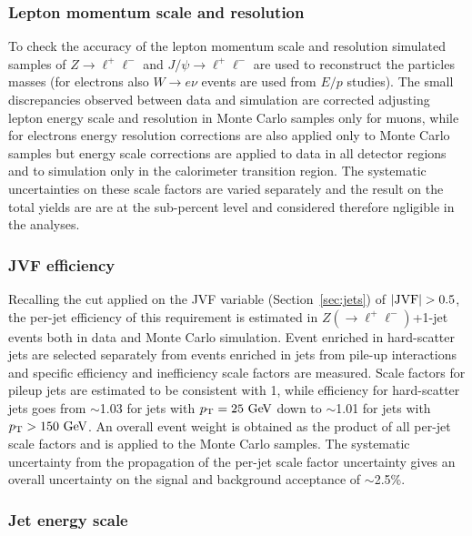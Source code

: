 \subsubsection{Lepton momentum scale and resolution}

To check the accuracy of the lepton momentum scale and resolution
simulated samples of $Z\to \ell^+\ell^-$ and $J/\psi \to \ell^+\ell^-$
are used to reconstruct the particles masses (for electrons also
 $W\to e\nu$ events are used from  $E/p$  studies).
The small discrepancies observed between data and simulation are
corrected adjusting lepton energy scale and resolution in Monte Carlo
samples only for muons, while for electrons energy resolution corrections
are also applied only to Monte Carlo samples but energy scale corrections
are applied to data in all detector regions and to simulation only in 
the calorimeter transition region.
The systematic uncertainties on these scale factors are varied
separately and the result on the total yields are are at the 
sub-percent level and considered therefore ngligible in the analyses.

\subsubsection{JVF efficiency}
\label{sec:syst_jvf}

Recalling the cut applied on the JVF variable (Section~\ref{sec:jets}) 
of $|{\rm JVF}|>0.5$, the per-jet efficiency of this requirement
is estimated in $Z(\to \ell^+\ell^-)$+1-jet events both in data and
Monte Carlo simulation. Event enriched in hard-scatter jets are selected
separately from events enriched in jets from pile-up interactions and
specific efficiency and inefficiency scale factors are measured.
Scale factors for pileup jets are estimated to be consistent with 1, while
efficiency for hard-scatter jets goes from $\sim$1.03 for jets with $\pt=25\gev$
down to $\sim$1.01 for jets with $\pt>150\gev$.
An overall event weight is obtained as the product of all per-jet scale factors
and is applied to the Monte Carlo samples.
The systematic uncertainty from the propagation of the per-jet scale
factor uncertainty gives an overall uncertainty on the signal
and background acceptance of $\sim$2.5\%.


\subsubsection{Jet energy scale}
\label{sec:syst_jes}

